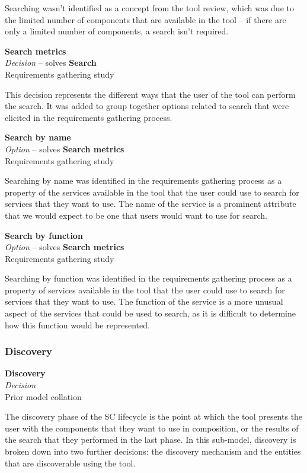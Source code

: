 Searching wasn't identified as a concept from the tool review, which was due to the limited number of components that are available in the tool -- if there are only a limited number of components, a search isn't required.

\textbf{Search metrics} \\ \emph{Decision} -- solves \textbf{Search} \\ Requirements gathering study

This decision represents the different ways that the user of the tool can perform the search. It was added to group together options related to search that were elicited in the requirements gathering process.

\textbf{Search by name} \\ \emph{Option} -- solves \textbf{Search metrics} \\ Requirements gathering study

Searching by name was identified in the requirements gathering process as a property of the services available in the tool that the user could use to search for services that they want to use. The name of the service is a prominent attribute that we would expect to be one that users would want to use for search.

\textbf{Search by function} \\ \emph{Option} -- solves \textbf{Search metrics} \\ Requirements gathering study

Searching by function was identified in the requirements gathering process as a property of services available in the tool that the user could use to search for services that they want to use. The function of the service is a more unusual aspect of the services that could be used to search, as it is difficult to determine how this function would be represented.

\subsubsection{Discovery}

\textbf{Discovery} \\ \emph{Decision} \\ Prior model collation \cite{Mehandjiev2012}

The discovery phase of the SC lifecycle is the point at which the tool presents the user with the components that they want to use in composition, or the results of the search that they performed in the last phase. In this sub-model, discovery is broken down into two further decisions: the discovery mechanism and the entities that are discoverable using the tool.

